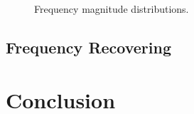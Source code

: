 \documentclass[conference]{IEEEtran}
\begin{document}
\begin{figure}[!t]
{\label{fig_frequencies_5}}
\caption{Frequency magnitude distributions.}
\label{fig_frequencies}
\end{figure}

\subsection{Frequency Recovering}

\section{Conclusion}
\end{document}

